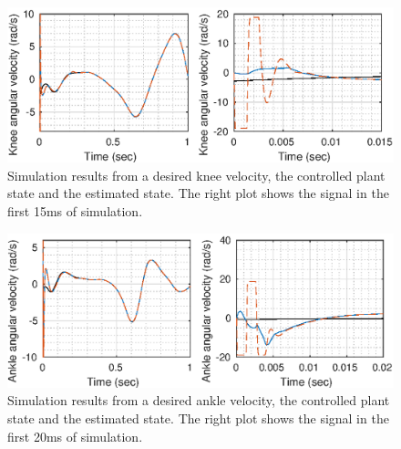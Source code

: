 \documentclass[letterpaper, 10 pt, conference]{ieeeconf}  %
\theoremstyle{plain}
\theoremstyle{definition}
\theoremstyle{remark}
\begin{document}
%
%
\begin{figure}[h!]
	\begin{center}
	\includegraphics[width = \columnwidth]{Figs/dq_knee_mu_fix_1e-03.eps}
	\caption{Simulation results from a desired knee velocity, the controlled plant state and the estimated state. The right plot shows the signal in the first 15ms of simulation.}
	\label{fig:dknee}
	\end{center}
\end{figure}
%
%
\begin{figure}[h!]
	\begin{center}
	\includegraphics[width = \columnwidth]{Figs/dq_ankle_mu_fix_1e-03.eps}
	\caption{Simulation results from a desired ankle velocity, the controlled plant state and the estimated state. The right plot shows the signal in the first 20ms of simulation.}
	\label{fig:dankle}
	\end{center}
\end{figure}
%

\begin{table}[]
	\centering
	\caption{RMSE for HGO states and the desired trajectory in each joint of a prosthetic leg according to the observer gain $\mu$}
\end{table}
\end{document}
